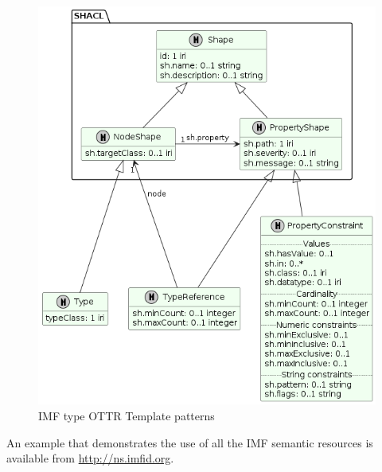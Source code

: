 \begin{figure}[htb]
  \centering
  \includegraphics[width=.8\textwidth]{img/types/imf-types.png}
  \caption{IMF type OTTR Template patterns}
  \label{fig:Figure 29}
\end{figure}

An example that demonstrates the use of all the IMF semantic resources is
available from \url{http://ns.imfid.org}.








